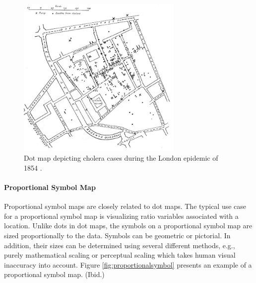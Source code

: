 \begin{figure}[htbp]
  \begin{center}
    \includegraphics[width=8cm]{images/dot-example.jpg}
    \caption{Dot map depicting cholera cases during the London epidemic of 1854 \citep{snow_cholera_1854}.}
    \label{fig:dot}
  \end{center}
\end{figure}

\paragraph{Proportional Symbol Map}

Proportional symbol maps are closely related to dot maps. The typical use case for a proportional symbol map is visualizing ratio variables associated with a location. Unlike dots in dot maps, the symbols on a proportional symbol map are sized proportionally to the data. Symbols can be geometric or pictorial. In addition, their sizes can be determined using several different methods, e.g., purely mathematical scaling or perceptual scaling which takes human visual inaccuracy into account. Figure \ref{fig:proportionalsymbol} presents an example of a proportional symbol map. (Ibid.)

